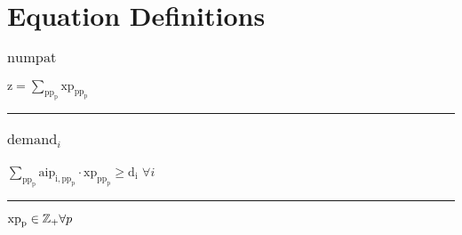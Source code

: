 \documentclass[11pt]{article}
\begin{document}
\section*{Equation Definitions}
\subsubsection*{\begin{math}\text{numpat}\end{math}}
\begin{math}
\text{z} = \displaystyle \sum_{\text{pp}_{\text{p}}} \text{xp}_{\text{pp}_{\text{p}}}
\end{math}
\vspace{5pt}
\hrule
\subsubsection*{\begin{math}\text{demand}_{i}\end{math}}
\begin{math}
\displaystyle \sum_{\text{pp}_{\text{p}}} \text{aip}_{\text{i},\text{pp}_{\text{p}}} \cdot \text{xp}_{\text{pp}_{\text{p}}} \geq \text{d}_{\text{i}}
\end{math}
\hfill
\begin{math}
\forall i
\end{math}\vspace{5pt}
\hrule
\bigskip
\begin{math}\text{xp}_{\text{p}}\in \mathbb{Z}_{+} \forall p\\\end{math}
\end{document}
